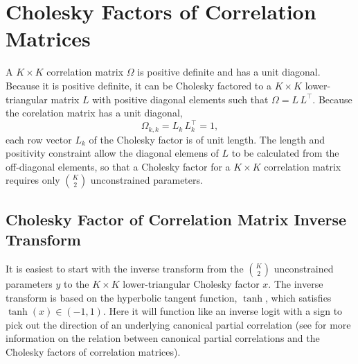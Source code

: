 \section{Cholesky Factors of Correlation Matrices}

A $K \times K$ correlation matrix $\Omega$ is positive definite and
has a unit diagonal.  Because it is positive definite, it can be
Cholesky factored to a $K \times K$ lower-triangular matrix $L$ with
positive diagonal elements such that $\Omega = L\,L^{\top}$.  Because
the corelation matrix has a unit diagonal,
\[
\Omega_{k,k} = L_k\,L_k^{\top} = 1, 
\]
each row vector $L_k$ of the Cholesky factor is of unit length.  The
length and positivity constraint allow the diagonal elemens of $L$ to
be calculated from the off-diagonal elements, so that a Cholesky
factor for a $K \times K$ correlation matrix requires only
$\binom{K}{2}$ unconstrained parameters.

\subsection{Cholesky Factor of Correlation Matrix Inverse Transform}

It is easiest to start with the inverse transform from the
$\binom{K}{2}$ unconstrained parameters $y$ to the $K \times K$
lower-triangular Cholesky factor $x$.  The inverse transform is based
on the hyperbolic tangent function, $\tanh$, which satisfies $\tanh(x)
\in (-1,1)$.  Here it will function like an inverse logit with a sign
to pick out the direction of an underlying canonical partial
correlation (see  for more
information on the relation between canonical partial correlations and
the Cholesky factors of correlation matrices).

